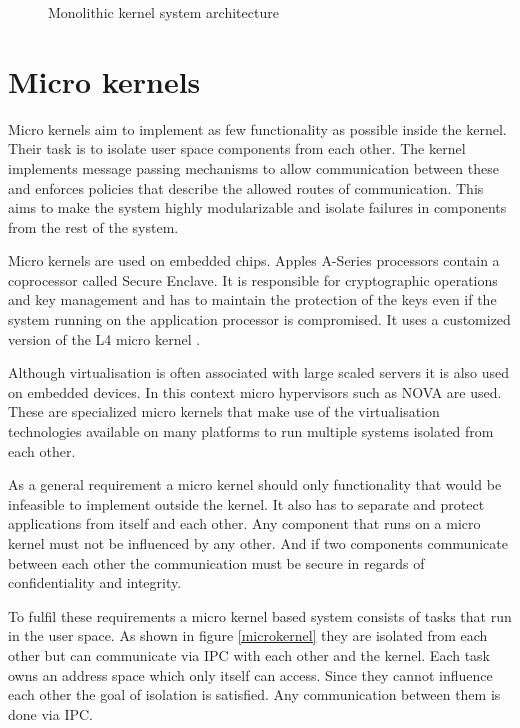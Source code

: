 \documentclass[
a4paper,
12pt,
notitlepage,
parskip=half,
DIV=11,
]{scrbook}
\begin{document}
		
		\begin{figure}
			\centering
			\def\svgwidth{\textwidth}
			
			\caption{Monolithic kernel system architecture}
			\label{monolithickernel}    
		\end{figure}
		
		\section{Micro kernels}
		
		Micro kernels aim to implement as few functionality as possible inside the kernel.
		Their task is to isolate user space components from each other.
		The kernel implements message passing mechanisms to allow communication between these and enforces policies that describe the allowed routes of communication.
		This aims to make the system highly modularizable and isolate failures in components from the rest of the system.
		
		Micro kernels are used on embedded chips.
		Apples A-Series processors contain a coprocessor called Secure Enclave.
		It is responsible for cryptographic operations and key management and has to maintain the protection of the keys even if the system running on the application processor is compromised.
		It uses a customized version of the L4 micro kernel \citep{ios11sec} \citep{Heiser:2016:LML:2912578.2893177}.
		
		Although virtualisation is often associated with large scaled servers it is also used on embedded devices.
		In this context micro hypervisors such as NOVA \citep{Steinberg:2010:NMS:1755913.1755935} are used.
		These are specialized micro kernels that make use of the virtualisation technologies available on many platforms to run multiple systems isolated from each other. \citep{ibmvirt}
		
		As a general requirement a micro kernel should only functionality that would be infeasible to implement outside the kernel.
		It also has to separate and protect applications from itself and each other.
		Any component that runs on a micro kernel must not be influenced by any other. And if two components communicate between each other the communication must be secure in regards of confidentiality and integrity.
		
		To fulfil these requirements a micro kernel based system consists of tasks that run in the user space.
		As shown in figure \ref{microkernel} they are isolated from each other but can communicate via IPC with each other and the kernel.
		Each task owns an address space which only itself can access.
		Since they cannot influence each other the goal of isolation is satisfied.
		Any communication between them is done via IPC.
		
\end{document}
